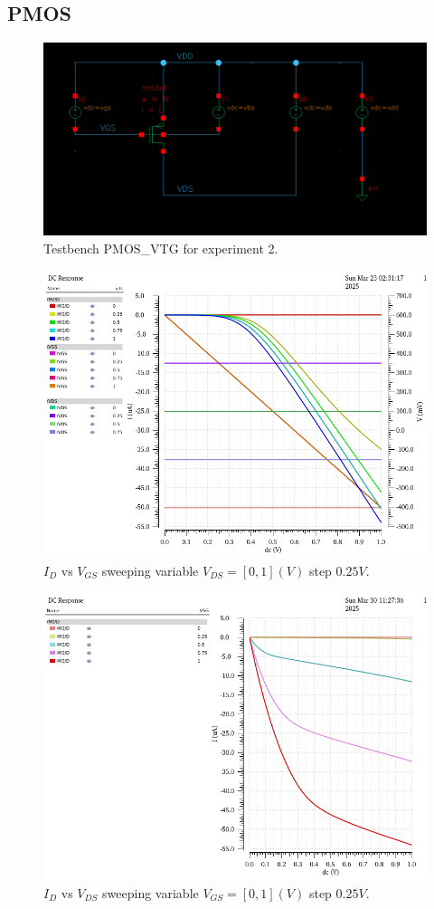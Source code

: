 \subsection{PMOS}
\begin{figure}[H]
	\centering
	\includegraphics[width = 0.6\linewidth]{sections/pic/EX2_PMOS.png}
	\caption{Testbench PMOS\_VTG for experiment 2.}
	\label{f_ex2PMOS-schematic}
\end{figure}


\begin{figure}[H]
	\centering
	\includegraphics[width = .6\linewidth]{sections/pic/EX2_PMOS_Id&Vgs(Vds_0_1_0_25)(w)(l).png}
	\caption{$I_D$ vs $V_{GS}$ sweeping variable $V_{DS} = [0, 1](V)$ step $0.25V$.}
	\label{f_EX2_PMOS_Id&Vgs(Vds_0_1_0_25)(w)(l)}
\end{figure}


\begin{figure}[H]
	\centering
	\includegraphics[width = .6\linewidth]{sections/pic/EX2_PMOS_Id&Vds(Vgs_0_1_0_25)(w)(l).png}
	\caption{$I_D$ vs $V_{DS}$ sweeping variable $V_{GS} = [0, 1](V)$ step $0.25V$.}
	\label{f_EX2_PMOS_Id&Vds(Vgs_0_1_0_25)(w)(l)}
\end{figure}

